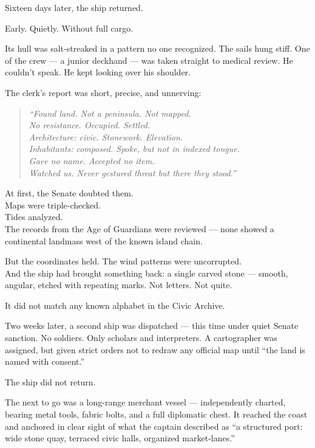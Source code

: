 \documentclass[12pt]{article}
\begin{document}
Sixteen days later, the ship returned.

Early. Quietly. Without full cargo.

Its hull was salt-streaked in a pattern no one recognized. The sails hung stiff. One of the crew --- a junior deckhand --- was taken straight to medical review. He couldn’t speak. He kept looking over his shoulder.

The clerk’s report was short, precise, and unnerving:

\begin{quote}
\textit{“Found land. Not a peninsula. Not mapped.}\\
\textit{No resistance. Occupied. Settled.}\\
\textit{Architecture: civic. Stonework. Elevation.}\\
\textit{Inhabitants: composed. Spoke, but not in indexed tongue.}\\
\textit{Gave no name. Accepted no item.}\\
\textit{Watched us. Never gestured threat but there they stood.”}
\end{quote}

\vspace{1em}

At first, the Senate doubted them.\\
Maps were triple-checked.\\
Tides analyzed.\\
The records from the Age of Guardians were reviewed --- none showed a continental landmass west of the known island chain.

But the coordinates held. The wind patterns were uncorrupted.\\
And the ship had brought something back: a single carved stone --- smooth, angular, etched with repeating marks. Not letters. Not quite.

It did not match any known alphabet in the Civic Archive.

\vspace{1em}

Two weeks later, a second ship was dispatched --- this time under quiet Senate sanction. No soldiers. Only scholars and interpreters. A cartographer was assigned, but given strict orders not to redraw any official map until ``the land is named with consent.”

The ship did not return.

\vspace{1em}

The next to go was a long-range merchant vessel --- independently charted, bearing metal tools, fabric bolts, and a full diplomatic chest. It reached the coast and anchored in clear sight of what the captain described as ``a structured port: wide stone quay, terraced civic halls, organized market-lanes.”
\end{document}
